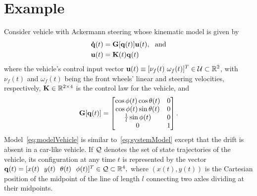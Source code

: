 \documentclass[
12pt,draftcls,onecolumn%
]{IEEEtran}
\begin{document}
\section{Example}
\label{sec:example}
Consider vehicle with Ackermann steering whose kinematic model is given by %
%
\begin{align}
\label{eq:modelVehicle}
{\bf \dot q}(t) &= {\bf G}[{\bf q}(t)]{\bf u}(t),~~\mathrm{and}\\
\label{eq:feedbackControlSimulation}
{\bf u}(t) & = {\bf K}(t){\bf q}(t)
\end{align}
where the vehicle's control input vector ${\bf u}(t)\equiv [\nu_f(t)~\omega_f(t)]^T\in{\cal U}\subset\mathbb{R}^2$, with $\nu_f(t)$ and $\omega_f(t)$ being the front wheels' linear and steering velocities, respectively, ${\bf K} \in \mathbb{R}^{2\times 4}$ is the control law for the vehicle,  and
\begin{equation*}
{\bf G}[{\bf q}(t)]=
\begin{bmatrix}
\cos\phi(t)\cos\theta (t) &0\\
\cos\phi(t)\sin\theta (t) & 0\\
\frac{1}{l}\sin\phi(t) & 0\\
0& 1
\end{bmatrix}.
\end{equation*}   
%
%
Model~\eqref{eq:modelVehicle} is similar to~\eqref{eq:systemModel} except that the drift is absent in a car-like vehicle. If ${\cal Q}$ denotes the set of state trajectories of the vehicle, its configuration at any time $t$ is represented by the vector ${\bf q}(t)=[x(t)~~y(t)~~\theta(t)~~\phi(t)]^T\in{\cal Q}\subset\mathbb{R}^4,$ where $(x(t),y(t))$ is the Cartesian position of the midpoint of the line of length $l$ connecting two axles dividing at their midpoints.%
\end{document}
